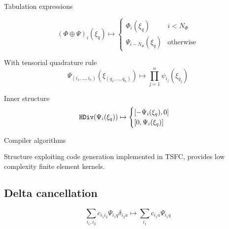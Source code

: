 \documentclass[cmyk,luatex,a0paper,portrait]{baposter}
\begin{document}
\begin{poster}
\begin{posterbox}[name=structure, column=0, below=introduction,
    span=3, height=0.275,
    ]{Tabulation expressions}
\begin{tcbraster}[raster columns=6,raster equal height=rows]
      \begin{tcolorbox}[title=Enriched, raster multicolumn=4,
        height=1.9cm, valign upper=center]
        \vspace{-\baselineskip}
        \begin{equation*}
          {(\Phi \oplus \Psi)}_i(\xi_q) \mapsto
          \begin{cases}
            \Phi_i(\xi_q) &\text{$i < N_\Phi$}\\
            \Psi_{i-N_\Phi}(\xi_q) &\text{otherwise}
          \end{cases}
        \end{equation*}
      \end{tcolorbox}
      \begin{tcolorbox}[title=Tensor product, raster multicolumn=3, height=2.25cm]
        With tensorial quadrature rule
        \tcblower
        \vspace{-0.96\baselineskip}
        \begin{equation*}
          \Psi_{(i_1, \dots, i_n)}(\xi_{(q_1, \dots, q_n)}) \mapsto \prod_{j=1}^{n} \psi_{i_j}(\xi_{q_j})
        \end{equation*}
      \end{tcolorbox}
      \begin{tcolorbox}[title=$\mathbf{H}(\text{div}/\text{curl})$,
        raster multicolumn=3, height=2.25cm]
        Inner structure
        \vspace{-0.5\baselineskip}
        \begin{equation*}
          \text{\texttt{HDiv}}(\Psi_i(\xi_q)) \mapsto
          \begin{cases}
            [-\Psi_i(\xi_q), 0]\\
            [0, \Psi_i(\xi_q)]
          \end{cases}
        \end{equation*}
      \end{tcolorbox}
    \end{tcbraster}
  \end{posterbox}

  \begin{posterbox}[name=rules, column=0, below=structure, span=3,
    height=0.275]{Compiler algorithms}
    \raggedright
    Structure exploiting code generation implemented in TSFC,
    provides low complexity finite element kernels.
    \vspace{-\baselineskip}
    \subsection*{Delta cancellation}
    \vspace{-0.35\baselineskip}
    \begin{equation*}
      \sum_{i_1, i_2} c_{i_1 i_2} \Psi_{i_1 q}
      \delta_{i_2 a} \mapsto \sum_{i_1} c_{i_1 a}\Psi_{i_1 q}
    \end{equation*}
    \vspace{-2\baselineskip}

\end{posterbox}
\end{poster}
\end{document}
